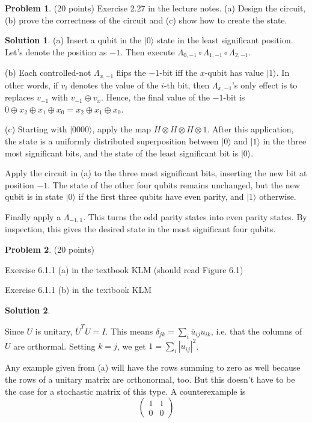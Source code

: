 \documentclass{article}
\theoremstyle{definition}
\newtheorem{problem}{Problem}
\newtheorem*{solution}{Solution}
\newcommand{\ket}[1]{|#1\rangle}
\begin{document}
\begin{problem}(20 points)
Exercise 2.27 in the lecture notes. (a) Design the circuit, 
(b) prove the correctness of the
circuit and (c) show how to create the state. 
\end{problem}
\begin{solution}
(a) Insert a qubit in the $\ket{0}$ state in the least significant position. Let's denote the position as
$-1$.  Then execute $\Lambda_{0,-1} \circ \Lambda_{1,-1} \circ \Lambda_{2,-1}$.

(b) Each controlled-not $\Lambda_{x,-1}$ flips the $-1$-bit iff the $x$-qubit has value $\ket{1}$.
In other words, if $v_i$ denotes the value of the $i$-th bit, then $\Lambda_{x,-1}$'s only effect
is to replaces $v_{-1}$ with $v_{-1} \oplus v_x$.
Hence, the final value of the $-1$-bit is
$0 \oplus x_2 \oplus x_1 \oplus x_0 = x_2 \oplus x_1 \oplus x_0$.

(c) Starting with $\ket{0000}$,  apply the map $H \otimes H \otimes H \otimes 1$.  
After this application, the state is a uniformly distributed superposition between $\ket{0}$ and
 $\ket{1}$ in the three most significant bits, and the state of the least
significant bit is $\ket{0}$.  

Apply the circuit in (a) to the three most significant bits, inserting the
new bit at position $-1$.  The state of the other four qubits remains unchanged, but the new
qubit is in state $\ket{0}$ if the first three qubits have even parity, and $\ket{1}$ otherwise.

Finally apply a $\Lambda_{-1, 1}$.  This turns the odd parity states into even parity states.  
By inspection, this gives the desired state in the most significant four qubits.
\end{solution}

\begin{problem}(20 points)
\begin{compactenum}[(a)]
\item Exercise 6.1.1 (a) in the textbook KLM (should read Figure 6.1)
\item Exercise 6.1.1 (b) in the textbook KLM
\end{compactenum}
\end{problem}
\begin{solution}
\begin{compactenum}[(a)]
\item Since $U$ is unitary, $\overline U^T U = I$.  This means $\delta_{jk} = \sum_i \overline u_{ij}  u_{ik}$, i.e. that the
columns of $U$ are orthormal.  Setting $k = j$, we get $1 = \sum_i |u_{ij}|^2$.
\item Any example given from (a) will have the rows summing to zero as well because the rows of a unitary matrix are orthonormal, too.  But this
doesn't have to be the case for a stochastic matrix of this type.  A counterexample is
$$
\begin{pmatrix}
1 & 1 \\
0 & 0
\end{pmatrix}
$$
\end{compactenum}

\end{solution}
\end{document}
